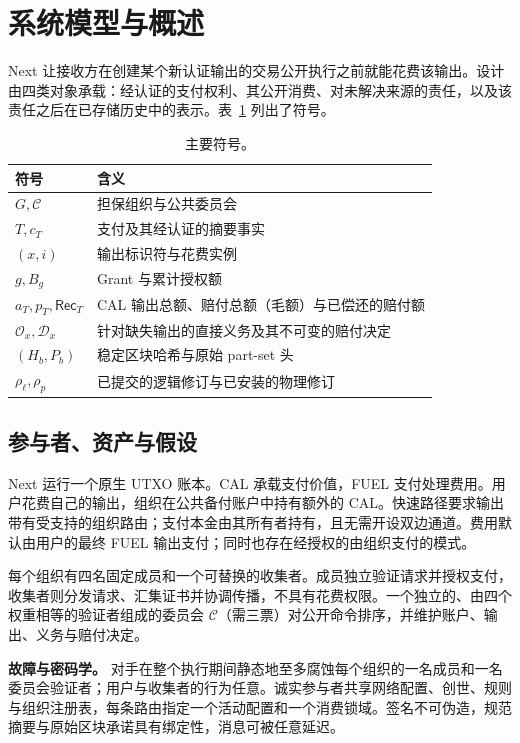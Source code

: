 \section{系统模型与概述}
\label{sec:model}


Next 让接收方在创建某个新认证输出的交易公开执行之前就能花费该输出。设计由四类对象承载：经认证的支付权利、其公开消费、对未解决来源的责任，以及该责任之后在已存储历史中的表示。表~\ref{tab:model-notation} 列出了符号。

\begin{table}[!b]
\caption{主要符号。}
\label{tab:model-notation}
\centering
\begin{tabular}{@{}p{}p{}@{}}
\toprule
符号 & 含义 \\
\midrule
$G,\mathcal C$ & 担保组织与公共委员会 \\
$T,c_T$ & 支付及其经认证的摘要事实 \\
$(x,i)$ & 输出标识符与花费实例 \\
$g,B_g$ & Grant 与累计授权额 \\
$a_T,p_T,\mathsf{Rec}_T$ & CAL 输出总额、赔付总额（毛额）与已偿还的赔付额 \\
$\mathcal O_x,\mathcal D_x$ & 针对缺失输出的直接义务及其不可变的赔付决定 \\
$(H_b,P_b)$ & 稳定区块哈希与原始 part-set 头 \\
$\rho_\ell,\rho_p$ & 已提交的逻辑修订与已安装的物理修订 \\
\bottomrule
\end{tabular}
\end{table}

\subsection{参与者、资产与假设}
\label{sec:model-participants}
Next 运行一个原生 UTXO 账本。CAL 承载支付价值，FUEL 支付处理费用。用户花费自己的输出，组织在公共备付账户中持有额外的 CAL。快速路径要求输出带有受支持的组织路由；支付本金由其所有者持有，且无需开设双边通道。费用默认由用户的最终 FUEL 输出支付；同时也存在经授权的由组织支付的模式。

每个组织有四名固定成员和一个可替换的收集者。成员独立验证请求并授权支付，收集者则分发请求、汇集证书并协调传播，不具有花费权限。一个独立的、由四个权重相等的验证者组成的委员会 $\mathcal C$（需三票）对公开命令排序，并维护账户、输出、义务与赔付决定。

\noindent\textbf{故障与密码学。}
对手在整个执行期间静态地至多腐蚀每个组织的一名成员和一名委员会验证者；用户与收集者的行为任意。诚实参与者共享网络配置、创世、规则与组织注册表，每条路由指定一个活动配置和一个消费锁域。签名不可伪造，规范摘要与原始区块承诺具有绑定性，消息可被任意延迟。

